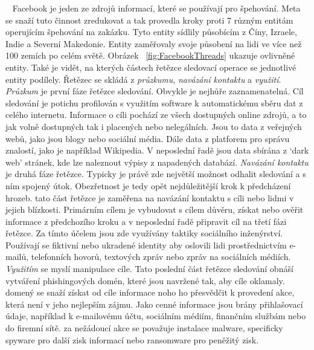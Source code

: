 ~
Facebook je jeden ze zdrojů informací, které se používají pro špehování.
Meta se snaží tuto činnost zredukovat a tak provedla kroky proti 7 různým entitám operujícím špehování na zakázku.
Tyto entity sídlily působícím z Číny, Izraele, Indie a Severní Makedonie.
Entity zaměřovaly svoje působení na lidi ve více než 100 zemích po celém světě.
Obrázek ~\ref{fig:FacebookThreads} ukazuje ovlivněné entity.
Také je vidět, na kterých částech řetězce sledovací operace se jednotlivé entity podílely.
Řetězec se skládá z \textit{průzkumu}, \textit{navázání kontaktu} a \textit{využití}.
\textit{Průzkum} je první fáze řetězce sledování.
Obvykle je nejhůře zaznamenatelná.
Cíl sledování je potichu profilován s využitím software k automatickému sběru dat z celého internetu.
Informace o cíli pochází ze všech dostupných online zdrojů, a to jak volně dostupných tak i placených nebo nelegálních.
Jsou to data z veřejných webů, jako jsou blogy nebo sociální média.
Dále data z platforem pro správu znalostí, jako je například Wikipedia.
V neposlední řadě jsou data sbírána z `dark web' stránek, kde lze naleznout výpisy z napadených databází.
\textit{Navázání kontaktu} je druhá fáze řetězce.
Typicky je právě zde největší možnost odhalit sledování a s ním spojený útok.
Obezřetnost je tedy opět nejdůležitější krok k předcházení hrozeb.
tato část řetězce je zaměřena na navázání kontaktu s cíli nebo lidmi v jejich blízkosti.
Primárním cílem je vybudovat s cílem důvěru, získat nebo ověřit informace z předchozího kroku a v neposlední řadě připravit cíl na třetí fázi řetězce.
Za tímto účelem jsou zde využívány taktiky sociálního inženýrství.
Používají se fiktivní nebo ukradené identity aby oslovili lidi prostřednictvím e-mailů, telefonních hovorů, textových zpráv nebo zpráv na sociálních médiích.
\textit{Využitím} se myslí manipulace cíle.
Tato poslední část řetězce sledování obnáší vytváření phishingových domén, které jsou navržené tak, aby cíle oklamaly.
domený se snaží získat od cíle informace noho ho přesvědčit k provedení akce, která není v jeho nejlepším zájmu.
Jako cenné informace jsou brány přihlašovací údaje, například k  e-mailovému účtu, sociálním médiím, finančním službám nebo do  firemní sítě.
za nežádoucí akce se považuje instalace malware, specificky spyware pro další zisk informací nebo ransomware pro peněžitý zisk.\cite{pegasus_facebook}

